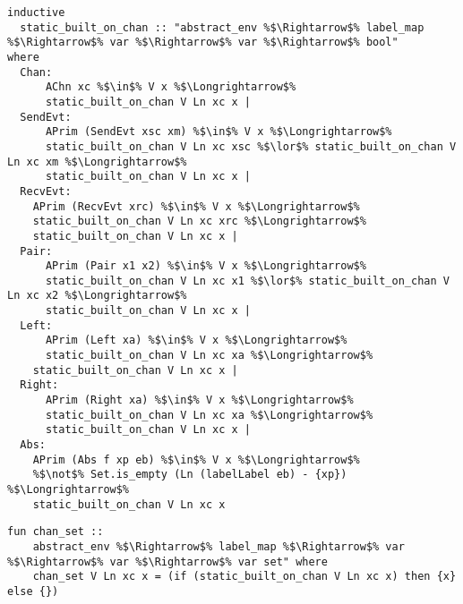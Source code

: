 \documentclass{article}
\begin{document}
\begin{lstlisting}[style=codestyle1, escapechar=\%]
inductive 
  static_built_on_chan :: "abstract_env %$\Rightarrow$% label_map %$\Rightarrow$% var %$\Rightarrow$% var %$\Rightarrow$% bool"
where
  Chan:
      AChn xc %$\in$% V x %$\Longrightarrow$% 
      static_built_on_chan V Ln xc x |
  SendEvt: 
      APrim (SendEvt xsc xm) %$\in$% V x %$\Longrightarrow$% 
      static_built_on_chan V Ln xc xsc %$\lor$% static_built_on_chan V Ln xc xm %$\Longrightarrow$% 
      static_built_on_chan V Ln xc x |
  RecvEvt:
    APrim (RecvEvt xrc) %$\in$% V x %$\Longrightarrow$% 
    static_built_on_chan V Ln xc xrc %$\Longrightarrow$% 
    static_built_on_chan V Ln xc x |
  Pair:
      APrim (Pair x1 x2) %$\in$% V x %$\Longrightarrow$%
      static_built_on_chan V Ln xc x1 %$\lor$% static_built_on_chan V Ln xc x2 %$\Longrightarrow$% 
      static_built_on_chan V Ln xc x |
  Left:
      APrim (Left xa) %$\in$% V x %$\Longrightarrow$% 
      static_built_on_chan V Ln xc xa %$\Longrightarrow$% 
    static_built_on_chan V Ln xc x |
  Right:
      APrim (Right xa) %$\in$% V x %$\Longrightarrow$% 
      static_built_on_chan V Ln xc xa %$\Longrightarrow$% 
      static_built_on_chan V Ln xc x |
  Abs:
    APrim (Abs f xp eb) %$\in$% V x %$\Longrightarrow$% 
    %$\not$% Set.is_empty (Ln (labelLabel eb) - {xp}) %$\Longrightarrow$%
    static_built_on_chan V Ln xc x 
  \end{lstlisting}



\begin{lstlisting}[style=codestyle1, escapechar=\%]
  fun chan_set ::
    abstract_env %$\Rightarrow$% label_map %$\Rightarrow$% var %$\Rightarrow$% var %$\Rightarrow$% var set" where
    chan_set V Ln xc x = (if (static_built_on_chan V Ln xc x) then {x} else {})
  \end{lstlisting}
\end{document}
